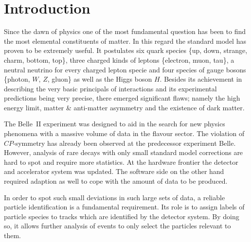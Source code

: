 \chapter{Introduction}
\label{chap:introduction}

Since the dawn of physics one of the most fundamental question has been to find the most elemental constituents of matter. In this regard the standard model has proven to be extremely useful. It postulates six quark species \{up, down, strange, charm, bottom, top\}, three charged kinds of leptons \{electron, muon, tau\}, a neutral neutrino for every charged lepton specie and four species of gauge bosons \{photon, $W$, $Z$, gluon\} as well as the Higgs boson $H$. Besides its achievement in describing the very basic principals of interactions and its experimental predictions being very precise, there emerged significant flaws; namely the high energy limit, matter \& anti-matter asymmetry and the existence of dark matter.

The Belle~\RN{2} experiment was designed to aid in the search for new physics phenomena with a massive volume of data in the flavour sector. The violation of $CP$-symmetry has already been observed at the predecessor experiment Belle. However, analysis of rare decays with only small standard model corrections are hard to spot and require more statistics. At the hardware frontier the detector and accelerator system was updated. The software side on the other hand required adaption as well to cope with the amount of data to be produced.

In order to spot such small deviations in such large sets of data, a reliable particle identification is a fundamental requirement. Its role is to assign labels of particle species to tracks which are identified by the detector system. By doing so, it allows further analysis of events to only select the particles relevant to them.

